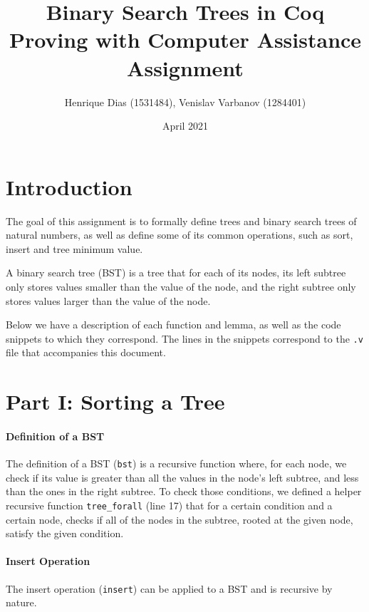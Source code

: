 \documentclass[a4paper]{article}
\title{%
  Binary Search Trees in Coq \\
  \large Proving with Computer Assistance Assignment}
\author{Henrique Dias (1531484), Venislav Varbanov (1284401)}
\date{April 2021}
\begin{document}
\maketitle

\section{Introduction}

The goal of this assignment is to formally define trees and binary search trees of natural numbers, as well as define some of its common operations, such as sort, insert and tree minimum value.

A binary search tree (BST) is a tree that for each of its nodes, its left subtree only stores values smaller than the value of the node, and the right subtree only stores values larger than the value of the node.

Below we have a description of each function and lemma, as well as the code snippets to which they correspond. The lines in the snippets correspond to the \texttt{.v} file that accompanies this document.

\section{Part I: Sorting a Tree}

\paragraph{Definition of a BST}

The definition of a BST (\texttt{bst}) is a recursive function where, for each node, we check if its value is greater than all the values in the node's left subtree, and less than the ones in the right subtree. To check those conditions, we defined a helper recursive function \texttt{tree\_forall} (line 17) that for a certain condition and a certain node, checks if all of the nodes in the subtree, rooted at the given node, satisfy the given condition.



\paragraph{Insert Operation}

The insert operation (\texttt{insert}) can be applied to a BST and is recursive by nature.
\end{document}
